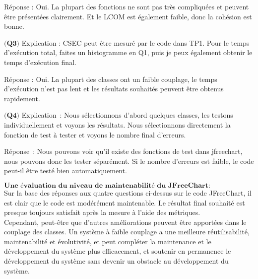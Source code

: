 \documentclass{article}
\begin{document}
Réponse : Oui. La plupart des fonctions ne sont pas très compliquées et peuvent être présentées clairement. Et le LCOM est également faible, donc la cohésion est bonne.

\item$\textbf{(Q3)}$
Explication : CSEC peut être mesuré par le code dans TP1. Pour le temps d'exécution total, faites un histogramme en Q1, puis je peux également obtenir le temps d'exécution final.

Réponse : Oui. La plupart des classes ont un faible couplage, le temps d'exécution n'est pas lent et les résultats souhaités peuvent être obtenus rapidement.

\item$\textbf{(Q4)}$
Explication : Nous sélectionnons d'abord quelques classes, les testons individuellement et voyons les résultats. Nous sélectionnons directement la fonction de test à tester et voyons le nombre final d'erreurs.

Réponse : Nous pouvons voir qu'il existe des fonctions de test dans jfreechart, nous pouvons donc les tester séparément. Si le nombre d'erreurs est faible, le code peut-il être testé bien automatiquement.\\

\item$\textbf{Une évaluation du niveau de maintenabilité du JFreeChart:}$\\
Sur la base des réponses aux quatre questions ci-dessus sur le code JFreeChart, il est clair que le code est modérément maintenable. Le résultat final souhaité est presque toujours satisfait après la mesure à l'aide des métriques.\\
Cependant, peut-être que d'autres améliorations peuvent être apportées dans le couplage des classes. Un système à faible couplage a une meilleure réutilisabilité, maintenabilité et évolutivité, et peut compléter la maintenance et le développement du système plus efficacement, et soutenir en permanence le développement du système sans devenir un obstacle au développement du système.
\end{document}
